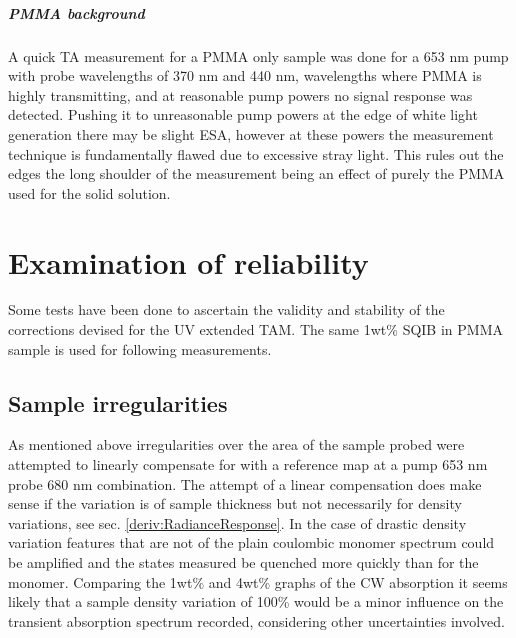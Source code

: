 \documentclass[twoside,openright]{scrreprt}
\begin{document}
\paragraph{PMMA background}
A quick TA measurement for a PMMA only sample was done for a 653 nm pump with probe wavelengths of 370 nm and 440 nm,  wavelengths where PMMA is highly transmitting, and at reasonable pump powers no signal response was detected. Pushing it to unreasonable pump powers at the edge of white light generation there may be slight ESA, however at these powers the measurement technique is fundamentally flawed due to excessive stray light. This rules out the edges the long shoulder of the measurement being an effect of purely the PMMA used for the solid solution.




\chapter{Examination of reliability}\label{chpt:reliability}
Some tests have been done to ascertain the validity and stability of the corrections devised for the UV extended TAM. The same 1wt\% SQIB in PMMA sample is used for following measurements.
\section{Sample irregularities}
As mentioned above irregularities over the area of the sample probed were attempted to linearly compensate for with a reference map at a pump 653 nm probe 680 nm combination. The attempt of a linear compensation does make sense if the variation is of sample thickness but not necessarily for density variations, see sec. \ref{deriv:RadianceResponse}. In the case of drastic density variation features that are not of the plain coulombic monomer spectrum could be amplified and the states measured be quenched more quickly than for the monomer. Comparing the 1wt\% and 4wt\% graphs of the CW absorption it seems likely that a sample density variation of 100\% would be a minor influence on the transient absorption spectrum recorded, considering other uncertainties involved.
\end{document}
